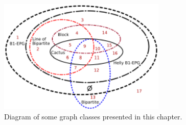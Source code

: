  \begin{figure}[htb]	
 \center%
 \includegraphics[width=8cm]{./img/diagram.pdf}
 \caption{Diagram of some graph classes presented in this chapter.}
\label{fig:diagram}
\end{figure}  
 